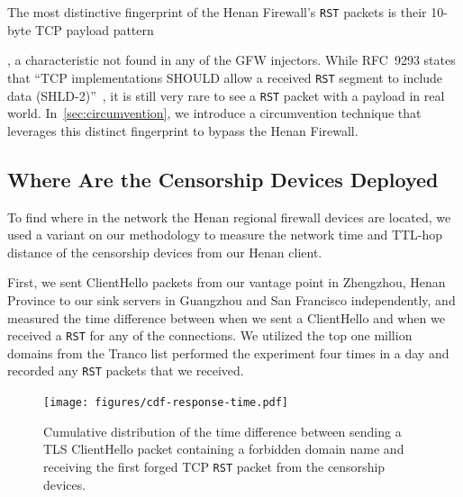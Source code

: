\documentclass[conference,compsoc]{IEEEtran}
\begin{document}
The most distinctive fingerprint of the Henan Firewall's \texttt{RST} packets is their 10-byte TCP payload pattern
\begin{bytebox}\end{bytebox},
a characteristic not found in any of the GFW injectors.
While RFC~9293 states that ``TCP implementations SHOULD allow a received \texttt{RST} segment to include data (SHLD-2)''~\cite[\S 3.5.3]{rfc9293},
it is still very rare to see a \texttt{RST} packet with a payload in real world.
In~\autoref{sec:circumvention},
we introduce a circumvention technique that leverages this distinct fingerprint to bypass the Henan Firewall.

\subsection{Where Are the Censorship Devices Deployed}
\label{sec:location}

To find where in the network the Henan regional firewall devices are located, we used a variant on our methodology to measure the network time and TTL-hop distance of the censorship devices from our Henan client.

First, we sent ClientHello packets from our vantage point in Zhengzhou,
Henan Province to our sink servers in Guangzhou and San Francisco independently,
and measured the time difference between when we sent a ClientHello and when we received a \texttt{RST} for
any of the connections. We utilized the top one million domains from the Tranco list
performed the experiment four times in a day and recorded any \texttt{RST} packets that we received.

\begin{figure}[h!]
  \centering
  \texttt{[image: figures/cdf-response-time.pdf]}
  \caption{
  Cumulative distribution of the time difference
  between sending a TLS ClientHello packet containing a forbidden domain name
  and receiving the first forged TCP \texttt{RST} packet from the censorship devices.
  }
  \label{fig:cdf-response-time}
\end{figure}
\end{document}
